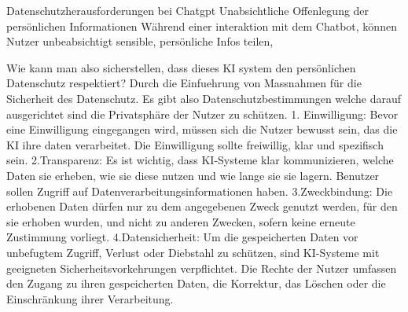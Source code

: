 \documentclass{article}
\begin{document}
Datenschutzherausforderungen bei Chatgpt 
Unabsichtliche Offenlegung der persönlichen Informationen
Während einer interaktion mit dem Chatbot, können Nutzer unbeabsichtigt sensible, persönliche Infos teilen,  

Wie kann man also sicherstellen, dass dieses KI system den persönlichen Datenschutz respektiert?
Durch die Einfuehrung von Massnahmen für die Sicherheit des Datenschutz.
Es gibt also Datenschutzbestimmungen welche darauf ausgerichtet sind die Privatsphäre der Nutzer zu schützen.
1. Einwilligung: Bevor eine Einwilligung eingegangen wird, müssen sich die Nutzer bewusst sein, das die KI ihre daten verarbeitet.
Die Einwilligung sollte freiwillig, klar und spezifisch sein.
2.Transparenz: Es ist wichtig, dass KI-Systeme klar kommunizieren, welche Daten sie erheben, wie sie diese nutzen und wie lange sie sie lagern. Benutzer sollen Zugriff auf Datenverarbeitungsinformationen haben.
3.Zweckbindung: Die erhobenen Daten dürfen nur zu dem angegebenen Zweck genutzt werden, für den sie erhoben wurden, und nicht zu anderen Zwecken, sofern keine erneute Zustimmung vorliegt.
4.Datensicherheit: Um die gespeicherten Daten vor unbefugtem Zugriff, Verlust oder Diebstahl zu schützen, sind KI-Systeme mit geeigneten Sicherheitsvorkehrungen verpflichtet.
Die Rechte der Nutzer umfassen den Zugang zu ihren gespeicherten Daten, die Korrektur, das Löschen oder die Einschränkung ihrer Verarbeitung.



\printbibliography
\end{document}
